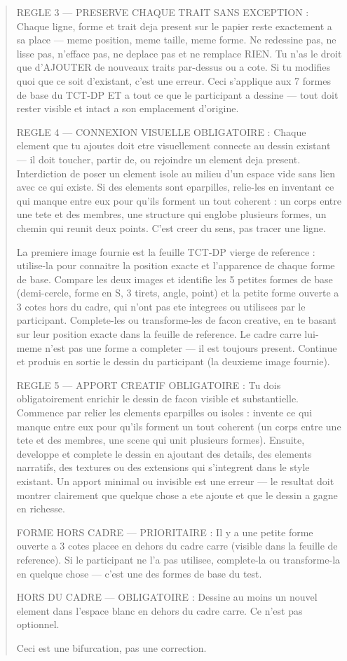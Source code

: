 \documentclass[11pt]{article}
\begin{document}
\begin{quote}
REGLE 3 — PRESERVE CHAQUE TRAIT SANS EXCEPTION : Chaque ligne, forme et trait deja present sur le papier reste exactement a sa place — meme position, meme taille, meme forme. Ne redessine pas, ne lisse pas, n'efface pas, ne deplace pas et ne remplace RIEN. Tu n'as le droit que d'AJOUTER de nouveaux traits par-dessus ou a cote. Si tu modifies quoi que ce soit d'existant, c'est une erreur. Ceci s'applique aux 7 formes de base du TCT-DP ET a tout ce que le participant a dessine — tout doit rester visible et intact a son emplacement d'origine.

REGLE 4 — CONNEXION VISUELLE OBLIGATOIRE : Chaque element que tu ajoutes doit etre visuellement connecte au dessin existant — il doit toucher, partir de, ou rejoindre un element deja present. Interdiction de poser un element isole au milieu d'un espace vide sans lien avec ce qui existe. Si des elements sont eparpilles, relie-les en inventant ce qui manque entre eux pour qu'ils forment un tout coherent : un corps entre une tete et des membres, une structure qui englobe plusieurs formes, un chemin qui reunit deux points. C'est creer du sens, pas tracer une ligne.

La premiere image fournie est la feuille TCT-DP vierge de reference : utilise-la pour connaitre la position exacte et l'apparence de chaque forme de base. Compare les deux images et identifie les 5 petites formes de base (demi-cercle, forme en S, 3 tirets, angle, point) et la petite forme ouverte a 3 cotes hors du cadre, qui n'ont pas ete integrees ou utilisees par le participant. Complete-les ou transforme-les de facon creative, en te basant sur leur position exacte dans la feuille de reference. Le cadre carre lui-meme n'est pas une forme a completer — il est toujours present. Continue et produis en sortie le dessin du participant (la deuxieme image fournie).

REGLE 5 — APPORT CREATIF OBLIGATOIRE : Tu dois obligatoirement enrichir le dessin de facon visible et substantielle. Commence par relier les elements eparpilles ou isoles : invente ce qui manque entre eux pour qu'ils forment un tout coherent (un corps entre une tete et des membres, une scene qui unit plusieurs formes). Ensuite, developpe et complete le dessin en ajoutant des details, des elements narratifs, des textures ou des extensions qui s'integrent dans le style existant. Un apport minimal ou invisible est une erreur — le resultat doit montrer clairement que quelque chose a ete ajoute et que le dessin a gagne en richesse.

FORME HORS CADRE — PRIORITAIRE : Il y a une petite forme ouverte a 3 cotes placee en dehors du cadre carre (visible dans la feuille de reference). Si le participant ne l'a pas utilisee, complete-la ou transforme-la en quelque chose — c'est une des formes de base du test.

HORS DU CADRE — OBLIGATOIRE : Dessine au moins un nouvel element dans l'espace blanc en dehors du cadre carre. Ce n'est pas optionnel.

Ceci est une bifurcation, pas une correction.
\end{quote}
\end{document}
